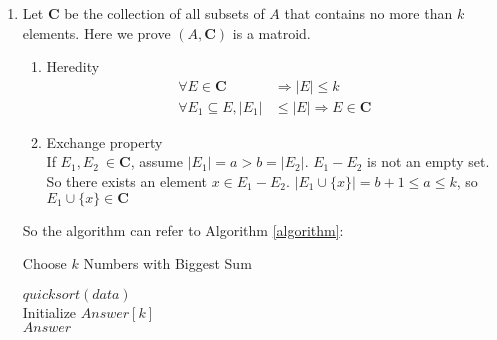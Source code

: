 \documentclass[12pt,a4paper]{article}
\makeatletter
\newtheorem*{solution}{Solution}
\theoremstyle{definition}
\renewenvironment{solution}[1][Solution] {\par\pushQED{\qed}\normalfont\topsep6\p@\@plus6\p@\relax\trivlist\item[\hskip\labelsep\bfseries#1\@addpunct{.}]\ignorespaces}{\popQED\endtrivlist\@endpefalse} \makeatother
\makeatother
\begin{document}
\begin{enumerate}
\begin{enumerate}
	    \begin{solution}
	    Let $\mathbf{C}$ be the collection of all subsets of $A$ that contains no more than $k$ elements. Here we prove $(A,\mathbf{C})$ is a matroid.
          \begin{enumerate}\item Heredity\\
          \begin{equation}
          \begin{aligned}
          \forall E \in \mathbf{C}&\Rightarrow |E|\le k\\
          \forall E_1 \subseteq E, |E_1|&\le |E|\Rightarrow E \in  \mathbf{C}
          \end{aligned}
          \end{equation}
          
        \item Exchange property\\
        If $E_1,E_2~\in \mathbf{C}$, assume $|E_1|=a>b=|E_2|$. $E_1-E_2$ is not an empty set. So there exists an element $x\in E_1-E_2$. $|E_1\cup \{x\}|=b+1\le a\le k$, so  $E_1\cup \{x\} \in \mathbf{C}$ 
    	        \end{enumerate}
    	So the algorithm can refer to Algorithm \ref{algorithm}:\\
    	  \begin{algorithm}[H]
        		
        \BlankLine
        \caption{Choose $k$ Numbers with Biggest Sum}
        \label{algorithm}
        $quicksort(data)$\\
        Initialize $Answer[k]$\\
        \Return $Answer$\;
        \end{algorithm}
	    \end{solution}
        

\end{enumerate}
\end{enumerate}
\end{document}
